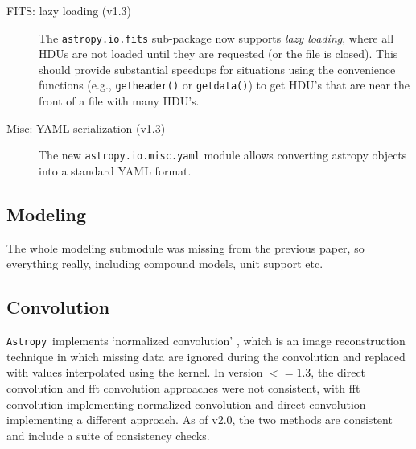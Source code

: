 \documentclass[modern]{aastex61}
\newcommand{\package}[1]{\texttt{#1}}
\newcommand{\astropypkg}{\package{Astropy}}
\begin{document}
\begin{description}
	\item [FITS: lazy loading (v1.3)]

		The \package{astropy.io.fits} sub-package now supports \emph{lazy
		loading}, where all HDUs are not loaded until they are requested (or
		the file is closed). This should provide substantial speedups for
		situations using the convenience functions (e.g., \texttt{getheader()}
		or \texttt{getdata()}) to get HDU’s that are near the front of a file
		with many HDU’s.

	\item [Misc: YAML serialization (v1.3)]

		The new \package{astropy.io.misc.yaml} module allows converting
		astropy objects into a standard YAML format.

\end{description}

\subsection{Modeling}
\label{sec:modeling}
The whole modeling submodule was missing from the previous paper, so everything really, including compound models, unit support etc.

\subsection{Convolution}

\astropypkg\ implements `normalized convolution' \citep[e.g.,][]{Knutsson1993}, which is an image reconstruction technique in which missing data are ignored during the convolution and replaced with values interpolated using the kernel.   In version $<=1.3$, the direct convolution and fft convolution approaches were not consistent, with fft convolution implementing normalized convolution and direct convolution implementing a different approach.  As of v2.0, the two methods are consistent and include a suite of consistency checks.
\end{document}
